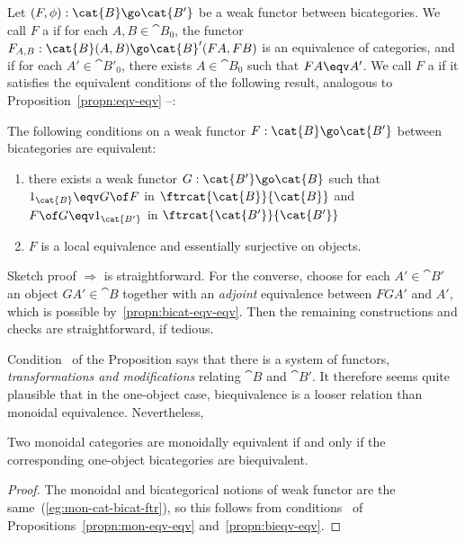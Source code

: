 Let $(F, \phi): \cat{B} \go \cat{B'}$ be a weak functor between
bicategories.  We call $F$ a  if for each $A, B
\in \cat{B}_0$, the functor $F_{A, B}: \cat{B}(A, B) \go \cat{B}'(FA, FB)$
is an equivalence of categories, and  if for each $A' \in \cat{B}'_0$, there exists $A \in \cat{B}_0$
such that $FA \eqv A'$.  We call $F$ a %
%
%
if it
satisfies the equivalent conditions of the following result, analogous to
Proposition~\ref{propn:eqv-eqv}%
--:
% 
\begin{propn}	
The following conditions on a weak functor $F: \cat{B} \go \cat{B'}$
between bicategories are equivalent:
%
\begin{enumerate}
\item	{}
  there exists a weak functor $G: \cat{B'} \go \cat{B}$ such that
  $1_\cat{B} \eqv G \of F$ in $\ftrcat{\cat{B}}{\cat{B}}$ and 
  $F \of G \eqv 1_\cat{B'}$ in $\ftrcat{\cat{B'}}{\cat{B'}}$
\item	{}
  $F$ is a local equivalence and essentially surjective on objects.
\end{enumerate}
\end{propn}
%
\begin{prooflike}{Sketch proof}
 $\Rightarrow$  is
straightforward.  For the converse, choose for each $A' \in \cat{B'}$ an
object $GA' \in \cat{B}$ together with an \emph{adjoint} equivalence
between $FGA'$ and $A'$, which is possible by~\ref{propn:bicat-eqv-eqv}.
Then the remaining constructions and checks are straightforward, if
tedious.  \done
\end{prooflike}

Condition~ of the Proposition says that there is
a system of functors, \emph{transformations and modifications} relating
$\cat{B}$ and $\cat{B'}$.  It therefore seems quite plausible that in the
one-object case, biequivalence is a looser relation than monoidal
equivalence.  Nevertheless,
%
\begin{cor}	%
%
%
Two monoidal categories are monoidally equivalent if and only if the
corresponding one-object bicategories are biequivalent. 
\end{cor}
%
\begin{proof}
The monoidal and bicategorical notions of weak functor are the
same~(\ref{eg:mon-cat-bicat-ftr}), so this follows from
conditions~ of
Propositions~\ref{propn:mon-eqv-eqv} and~\ref{propn:bieqv-eqv}. 
\done
\end{proof}


